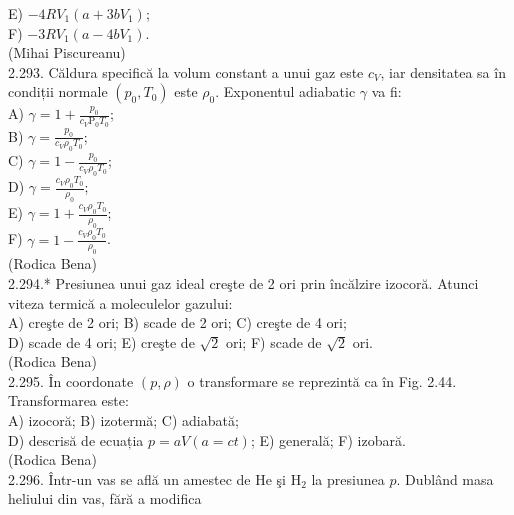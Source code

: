 \documentclass[10pt]{article}
\begin{document}
E) $-4 R V_{1}\left(a+3 b V_{1}\right)$;\\
F) $-3 R V_{1}\left(a-4 b V_{1}\right)$.\\
(Mihai Piscureanu)\\
2.293. Căldura specifică la volum constant a unui gaz este $c_{V}$, iar densitatea sa în condiții normale $\left(p_{0}, T_{0}\right)$ este $\rho_{0}$. Exponentul adiabatic $\gamma$ va fi:\\
A) $\gamma=1+\frac{p_{0}}{c_{V} \mathrm{P}_{0} T_{0}}$;\\
B) $\gamma=\frac{p_{0}}{c_{V} \rho_{0} T_{0}}$;\\
C) $\gamma=1-\frac{p_{0}}{c_{V} \rho_{0} T_{0}}$;\\
D) $\gamma=\frac{c_{V} \rho_{0} T_{0}}{\rho_{0}}$;\\
E) $\gamma=1+\frac{c_{V} \rho_{0} T_{0}}{\rho_{0}}$;\\
F) $\gamma=1-\frac{c_{V} \rho_{0} T_{0}}{\rho_{0}}$.\\
(Rodica Bena)\\
2.294.* Presiunea unui gaz ideal creşte de 2 ori prin încălzire izocoră. Atunci viteza termică a moleculelor gazului:\\
A) creşte de 2 ori; B) scade de 2 ori; C) creşte de 4 ori;\\
D) scade de 4 ori; E) creşte de $\sqrt{2}$ ori; F) scade de $\sqrt{2}$ ori.\\
(Rodica Bena)\\
2.295. În coordonate $(p, \rho)$ o transformare se reprezintă ca în Fig. 2.44. Transformarea este:\\
A) izocoră; B) izotermă; C) adiabată;\\
D) descrisă de ecuația $p=a V(a=c t)$; E) generală; F) izobară.\\
(Rodica Bena)\\
2.296. Într-un vas se află un amestec de He şi $\mathrm{H}_{2}$ la presiunea $p$. Dublând masa heliului din vas, fără a modifica\\
\end{document}
